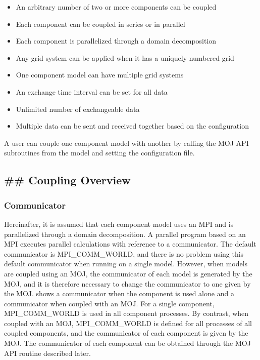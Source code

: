 \begin{itemize}
\item
  An arbitrary number of two or more components can be coupled
\item
  Each component can be coupled in series or in parallel
\item
  Each component is parallelized through a domain decomposition
\item
  Any grid system can be applied when it has a uniquely numbered grid
\item
  One component model can have multiple grid systems
\item
  An exchange time interval can be set for all data
\item
  Unlimited number of exchangeable data
\item
  Multiple data can be sent and received together based on the
  configuration
\end{itemize}

A user can couple one component model with another by calling the MOJ
API subroutines from the model and setting the configuration file.

\hypertarget{coupling-overview}{%
\subsection{\#\# Coupling Overview}\label{coupling-overview}}

\hypertarget{communicator}{%
\subsubsection{Communicator}\label{communicator}}

Hereinafter, it is assumed that each component model uses an MPI and is
parallelized through a domain decomposition. A parallel program based on
an MPI executes parallel calculations with reference to a communicator.
The default communicator is MPI\_COMM\_WORLD, and there is no problem
using this default communicator when running on a single model. However,
when models are coupled using an MOJ, the communicator of each model is
generated by the MOJ, and it is therefore necessary to change the
communicator to one given by the MOJ. shows a communicator when the
component is used alone and a communicator when coupled with an MOJ. For
a single component, MPI\_COMM\_WORLD is used in all component processes.
By contrast, when coupled with an MOJ, MPI\_COMM\_WORLD is defined for
all processes of all coupled components, and the communicator of each
component is given by the MOJ. The communicator of each component can be
obtained through the MOJ API routine described later.

